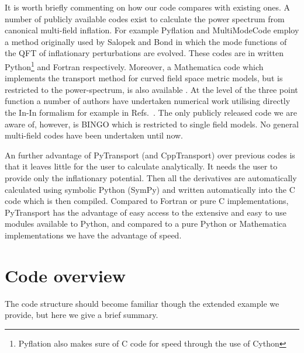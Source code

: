 \documentclass[10pt,
amsmath,amssymb,
aps,prd,nofootinbib,eqsecnum,a4paper]{revtex4}
\newcommand{\CC}{C\nolinebreak\hspace{-.05em}\raisebox{.4ex}{\tiny\bf +}\nolinebreak\hspace{-.10em}\raisebox{.4ex}{\tiny\bf +}}
\def\CC{{C\nolinebreak[4]\hspace{-.05em}\raisebox{.4ex}{\tiny\bf ++}}}
\def\S{ }
\begin{document}
It is worth briefly commenting on how our code compares with existing ones. A number of publicly available 
codes exist to calculate the power spectrum from canonical multi-field inflation. 
For example Pyflation \cite{Huston:2011fr} and 
MultiModeCode \cite{Price:2014xpa} employ a method originally used by Salopek and Bond \cite{Salopek:1988qh}
in which the mode functions of the QFT of inflationary perturbations are evolved. These codes are 
in written Python\footnote{Pyflation also makes sure of C code for speed through the use of Cython} and Fortran respectively.
Moreover, a Mathematica code which implements the transport method for curved field space 
metric models, but is restricted to the power-spectrum, is also available
\cite{Dias:2015rca}. At the level of the three point function a number of authors have undertaken 
numerical work utilising 
directly the In-In formalism for example in Refs.~\cite{Chen:2006xjb,Chen:2008wn, Hazra:2012yn,Funakoshi:2012ms,Horner:2013sea}. 
The only publicly released code we are aware of, however, is BINGO \cite{Hazra:2012yn} which is restricted to single field models. 
No general multi-field codes have been undertaken until now.

An further advantage of PyTransport (and CppTransport) over previous codes is that it leaves
little for the user to calculate analytically. 
It needs the user 
to provide only the inflationary potential. Then all the derivatives are automatically calculated using 
symbolic Python (SymPy) and written automatically into the \CC \S  code which is then compiled. 
Compared to Fortran or pure \CC \S  
implementations, PyTransport 
has the advantage of easy access to the extensive and easy to use modules available to 
Python, and compared to a pure Python or Mathematica implementations we have the advantage of speed.


\section{ Code overview} 

\noindent  The code structure should become familiar though the extended example we provide, but here we give a brief summary. 
\end{document}
